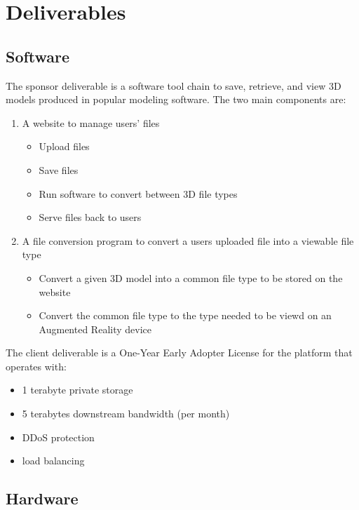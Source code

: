 \section{Deliverables}

 

\subsection{Software}
The sponsor deliverable is a software tool chain to save, retrieve, and view 3D models produced in popular modeling software. The two main components are:

\begin{enumerate}
	\item A website to manage users' files
		\begin{itemize}
			\item Upload files
			\item Save files
			\item Run software to convert between 3D file types
			\item Serve files back to users
		\end{itemize}
	\item A file conversion program to convert a users uploaded file into a viewable file type
		\begin{itemize}
			\item Convert a given 3D model into a common file type to be stored on the website
			\item Convert the common file type to the type needed to be viewd on an Augmented Reality device
		\end{itemize}
\end{enumerate}

\noindent The client deliverable is a One-Year Early Adopter License for the platform that operates with:

\begin{itemize} 
	\item 1 terabyte private storage 
	\item 5 terabytes downstream bandwidth (per month)
	\item DDoS protection
	\item load balancing
\end{itemize} 

\subsection{Hardware}

